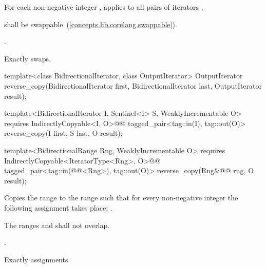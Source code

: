 \begin{itemdescr}
\pnum
\effects
For each non-negative integer
,
applies
to all pairs of iterators
.

\begin{removedblock}
\pnum
\requires
{} shall be swappable~(\ref{concepts.lib.corelang.swappable}).
\end{removedblock}

\begin{addedblock}
\pnum
\returns {}.
\end{addedblock}

\pnum
\complexity
Exactly
swaps.
\end{itemdescr}

%
\begin{removedblock}
\begin{itemdecl}
template<class BidirectionalIterator, class OutputIterator>
  OutputIterator
    reverse_copy(BidirectionalIterator first,
                 BidirectionalIterator last, OutputIterator result);
\end{itemdecl}
\end{removedblock}
\begin{addedblock}
\begin{itemdecl}
template<BidirectionalIterator I, Sentinel<I> S, WeaklyIncrementable O>
  requires IndirectlyCopyable<I, O>@\newtxt{()}@
  tagged_pair<tag::in(I), tag::out(O)> reverse_copy(I first, S last, O result);

template<BidirectionalRange Rng, WeaklyIncrementable O>
  requires IndirectlyCopyable<IteratorType<Rng>, O>@\newtxt{()}@
  tagged_pair<tag::in(@@<Rng>), tag::out(O)>
    reverse_copy(Rng&@\newtxt{\&}@ rng, O result);
\end{itemdecl}
\end{addedblock}

\begin{itemdescr}
\pnum
\effects
Copies the range
to the range
such that
for every non-negative integer
the following assignment takes place:
.

\pnum
\requires
The ranges
and
shall not overlap.

\pnum
\returns
{}.

\pnum
\complexity
Exactly
assignments.
\end{itemdescr}

